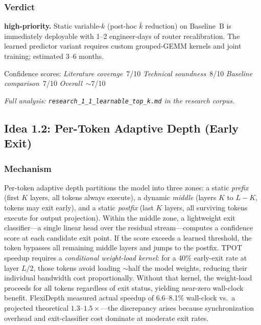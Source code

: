 \documentclass[11pt]{article}
\begin{document}
\subsubsection*{Verdict}
\textbf{high-priority.}
Static variable-$k$ (post-hoc $\bar{k}$ reduction) on Baseline~B is immediately deployable with 1--2 engineer-days of router recalibration.
The learned predictor variant requires custom grouped-GEMM kernels and joint training; estimated 3--6 months.

\noindent
Confidence scores:
\emph{Literature coverage}~7/10 \quad
\emph{Technical soundness}~8/10 \quad
\emph{Baseline comparison}~7/10 \quad
\emph{Overall}~$\sim$7/10
\par\noindent\textit{Full analysis: \texttt{research\_1\_1\_learnable\_top\_k.md} in the research corpus.}


\subsection{Idea 1.2: Per-Token Adaptive Depth (Early Exit)}
\label{subsec:idea-1-2}

\subsubsection*{Mechanism}
Per-token adaptive depth partitions the model into three zones: a static \emph{prefix} (first $K$ layers, all tokens always execute), a dynamic \emph{middle} (layers $K$ to $L{-}K$, tokens may exit early), and a static \emph{postfix} (last $K$ layers, all surviving tokens execute for output projection).
Within the middle zone, a lightweight exit classifier---a single linear head over the residual stream---computes a confidence score at each candidate exit point.
If the score exceeds a learned threshold, the token bypasses all remaining middle layers and jumps to the postfix.
TPOT speedup requires a \emph{conditional weight-load kernel}: for a 40\% early-exit rate at layer $L/2$, those tokens avoid loading $\sim$half the model weights, reducing their individual bandwidth cost proportionally.
Without that kernel, the weight-load proceeds for all tokens regardless of exit status, yielding near-zero wall-clock benefit.
FlexiDepth \cite{GaoEtAl2024} measured actual speedup of 6.6--8.1\% wall-clock vs.\ a projected theoretical $1.3$--$1.5\times$---the discrepancy arises because synchronization overhead and exit-classifier cost dominate at moderate exit rates.
\end{document}
